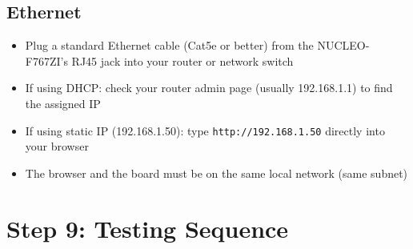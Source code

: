 \documentclass[11pt,a4paper]{article}
\begin{document}
\subsection{Ethernet}
\begin{itemize}[leftmargin=2em]
  \item Plug a standard Ethernet cable (Cat5e or better) from the NUCLEO-F767ZI's RJ45 jack into your router or network switch
  \item If using DHCP: check your router admin page (usually 192.168.1.1) to find the assigned IP
  \item If using static IP (192.168.1.50): type \texttt{http://192.168.1.50} directly into your browser
  \item The browser and the board must be on the same local network (same subnet)
\end{itemize}

\newpage

\section{Step 9: Testing Sequence}
\end{document}
